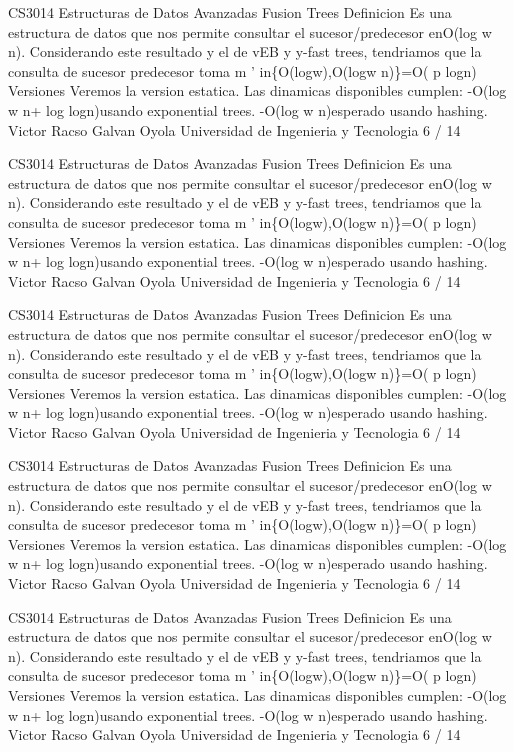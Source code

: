 \begin{description}[leftmargin=!,labelwidth=4.2em,style=nextline]
\item[Pag. 14] CS3014 Estructuras de Datos Avanzadas Fusion Trees Definicion Es una estructura de datos que nos permite consultar el sucesor/predecesor enO(log w n). Considerando este resultado y el de vEB y y-fast trees, tendriamos que la consulta de sucesor predecesor toma m ' in\{O(logw),O(logw n)\}=O( p logn) Versiones Veremos la version estatica. Las dinamicas disponibles cumplen: -O(log w n+ log logn)usando exponential trees. -O(log w n)esperado usando hashing. Victor Racso Galvan Oyola Universidad de Ingenieria y Tecnologia 6 / 14
\item[Pag. 15] CS3014 Estructuras de Datos Avanzadas Fusion Trees Definicion Es una estructura de datos que nos permite consultar el sucesor/predecesor enO(log w n). Considerando este resultado y el de vEB y y-fast trees, tendriamos que la consulta de sucesor predecesor toma m ' in\{O(logw),O(logw n)\}=O( p logn) Versiones Veremos la version estatica. Las dinamicas disponibles cumplen: -O(log w n+ log logn)usando exponential trees. -O(log w n)esperado usando hashing. Victor Racso Galvan Oyola Universidad de Ingenieria y Tecnologia 6 / 14
\item[Pag. 16] CS3014 Estructuras de Datos Avanzadas Fusion Trees Definicion Es una estructura de datos que nos permite consultar el sucesor/predecesor enO(log w n). Considerando este resultado y el de vEB y y-fast trees, tendriamos que la consulta de sucesor predecesor toma m ' in\{O(logw),O(logw n)\}=O( p logn) Versiones Veremos la version estatica. Las dinamicas disponibles cumplen: -O(log w n+ log logn)usando exponential trees. -O(log w n)esperado usando hashing. Victor Racso Galvan Oyola Universidad de Ingenieria y Tecnologia 6 / 14
\item[Pag. 17] CS3014 Estructuras de Datos Avanzadas Fusion Trees Definicion Es una estructura de datos que nos permite consultar el sucesor/predecesor enO(log w n). Considerando este resultado y el de vEB y y-fast trees, tendriamos que la consulta de sucesor predecesor toma m ' in\{O(logw),O(logw n)\}=O( p logn) Versiones Veremos la version estatica. Las dinamicas disponibles cumplen: -O(log w n+ log logn)usando exponential trees. -O(log w n)esperado usando hashing. Victor Racso Galvan Oyola Universidad de Ingenieria y Tecnologia 6 / 14
\item[Pag. 18] CS3014 Estructuras de Datos Avanzadas Fusion Trees Definicion Es una estructura de datos que nos permite consultar el sucesor/predecesor enO(log w n). Considerando este resultado y el de vEB y y-fast trees, tendriamos que la consulta de sucesor predecesor toma m ' in\{O(logw),O(logw n)\}=O( p logn) Versiones Veremos la version estatica. Las dinamicas disponibles cumplen: -O(log w n+ log logn)usando exponential trees. -O(log w n)esperado usando hashing. Victor Racso Galvan Oyola Universidad de Ingenieria y Tecnologia 6 / 14

\end{description}
